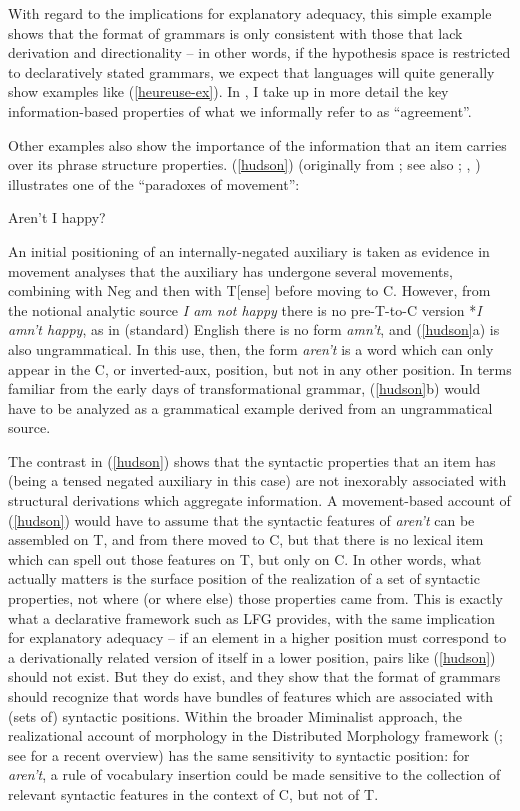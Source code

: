 \documentclass[output=paper,hidelinks]{langscibook}
\begin{document}
With regard to the implications for explanatory adequacy, this simple
example shows that the format of grammars is only consistent with
those that lack derivation and directionality -- in other words, if
the hypothesis space is restricted to declaratively stated grammars,
we expect that languages will quite generally show examples like
(\ref{heureuse-ex}). In , I take up in
more detail the key information-based properties of what we informally
refer to as ``agreement''.

Other examples also show the importance of the information that an
item carries over its phrase structure properties. (\ref{hudson})
(originally from \citealp{hudson77}; see also \citealp[64]{gkps};
\citealp[19]{bresnan2001lexical}, \citealp[14]{BresnanEtAl2016})
illustrates one of the ``paradoxes of movement'':

\ea\label{hudson}
   \ex
Aren't I happy?
\z
\z

An initial positioning of an internally-negated auxiliary is taken as
evidence in movement analyses that the auxiliary has undergone several
movements, combining with Neg and then with T[ense] before moving to
C. However, from the notional analytic source \textit{I am not happy}
there is no pre-T-to-C version *\textit{I amn't happy}, as in (standard)
English there is no form \textit{amn't}, and (\ref{hudson}a) is also
ungrammatical. In this use, then, the form \textit{aren't} is a word
which can only appear in the C, or inverted-aux, position, but not in
any other position. In terms familiar from the early days of
transformational grammar, (\ref{hudson}b) would have to be analyzed as
a grammatical example derived from an ungrammatical source.

The contrast in (\ref{hudson}) shows that the syntactic properties
that an item has (being a tensed negated auxiliary in this case) are
not inexorably associated with structural derivations which aggregate
information. A movement-based account of (\ref{hudson}) would have to
assume that the syntactic features of \textit{aren't} can be assembled
on T, and from there moved to C, but that there is no lexical item
which can spell out those features on T, but only on C. In other
words, what actually matters is the surface position of the
realization of a set of syntactic properties, not where (or where
else) those properties came from. This is exactly what a declarative
framework such as LFG provides, with the same implication for
explanatory adequacy -- if an element in a higher position must
correspond to a derivationally related version of itself in a lower
position, pairs like (\ref{hudson}) should not exist. But they do
exist, and they show that the format of grammars should recognize that
words have bundles of features which are associated with (sets of)
syntactic positions. Within the broader Miminalist approach, the
realizational account of morphology in the Distributed Morphology
framework (\citealp{hallemarantz}; see \citealp{bobaljik17} for a
recent overview) has the same sensitivity to syntactic position: for
\textit{aren't}, a rule of vocabulary insertion could be made sensitive
to the collection of relevant syntactic features in the context of C,
but not of T.
\end{document}
